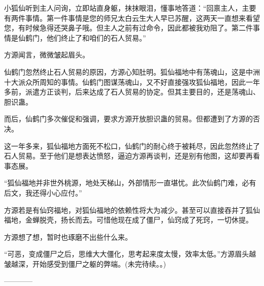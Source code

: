 \begin{this_body}
小狐仙听到主人问询，立即站直身躯，抹抹眼泪，懂事地答道：“回禀主人，主要有两件事情。第一件事情是您的师兄太白云生大人早已苏醒，这两天一直想来看望您，有时候急得还哭鼻子哦。但主人之前有过命令，因此都被我劝阻了。第二件事情是仙鹤门，他们终止了和咱们的石人贸易。”

方源闻言，微微皱起眉头。

仙鹤门忽然终止石人贸易的原因，方源心知肚明。狐仙福地中有荡魂山，这是中洲十大派众所周知的事情。仙鹤门图谋荡魂山，又不好直接强攻狐仙福地，因此一年多前，派遣方正谈判，后来达成了石人贸易的协定。但其主要目的，还是荡魂山、胆识蛊。

而后，仙鹤门多次催促和强调，要求方源开放胆识蛊的贸易。但都遭到了方源的否决。

这一年多来，狐仙福地方面死不松口，仙鹤门的耐心终于被耗尽，因此忽然终止了石人贸易。至于他们是想表达愤怒，逼迫方源再谈判，还是别有他图，这却要再看事态展。

“狐仙福地并非世外桃源，地处天梯山，外部情形一直堪忧。此次仙鹤门难，必有后文，我还得小心应付。”

方源若是有仙窍福地，对狐仙福地的依赖性将大为减少。甚至可以直接吞并了狐仙福地，金蝉脱壳，扬长而去。可惜他现在成了僵尸，仙窍成了死窍，一切休提。

方源想了想，暂时也琢磨不出些什么来。

“可恶，变成僵尸之后，思维大大僵化，思考起来度太慢，效率太低。”方源眉头越皱越深，开始感受到僵尸之躯的弊端。(未完待续。。)

------------

\end{this_body}

